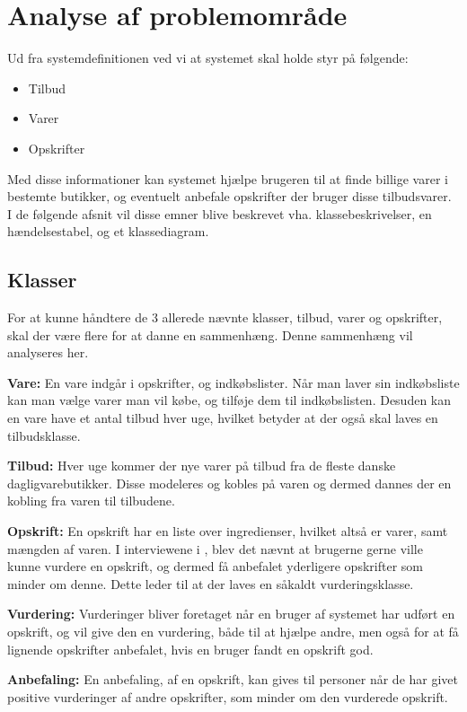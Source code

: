 \section{Analyse af problemområde}

Ud fra systemdefinitionen ved vi at systemet skal holde styr på følgende:

\begin{itemize}
	\item Tilbud
	\item Varer
	\item Opskrifter
\end{itemize}

Med disse informationer kan systemet hjælpe brugeren til at finde billige varer i bestemte butikker, og eventuelt anbefale opskrifter der bruger disse tilbudsvarer.
I de følgende afsnit vil disse emner blive beskrevet vha. klassebeskrivelser, en hændelsestabel, og et klassediagram.

\subsection{Klasser}
For at kunne håndtere de 3 allerede nævnte klasser, tilbud, varer og opskrifter, skal der være flere for at danne en sammenhæng.
Denne sammenhæng vil analyseres her.

\textbf{Vare:}
En vare indgår i opskrifter, og indkøbslister.
Når man laver sin indkøbsliste kan man vælge varer man vil købe, og tilføje dem til indkøbslisten.
Desuden kan en vare have et antal tilbud hver uge, hvilket betyder at der også skal laves en tilbudsklasse.

\textbf{Tilbud:}
Hver uge kommer der nye varer på tilbud fra de fleste danske dagligvarebutikker.
Disse modeleres og kobles på varen og dermed dannes der en kobling fra varen til tilbudene.

\textbf{Opskrift:}
En opskrift har en liste over ingredienser, hvilket altså er varer, samt mængden af varen.
I interviewene i , blev det nævnt at brugerne gerne ville kunne vurdere en opskrift, og dermed få anbefalet yderligere opskrifter som minder om denne.
Dette leder til at der laves en såkaldt vurderingsklasse.

\textbf{Vurdering:}
Vurderinger bliver foretaget når en bruger af systemet har udført en opskrift, og vil give den en vurdering, både til at hjælpe andre, men også for at få lignende opskrifter anbefalet, hvis en bruger fandt en opskrift god.

\textbf{Anbefaling:}
En anbefaling, af en opskrift, kan gives til personer når de har givet positive vurderinger af andre opskrifter, som minder om den vurderede opskrift.

